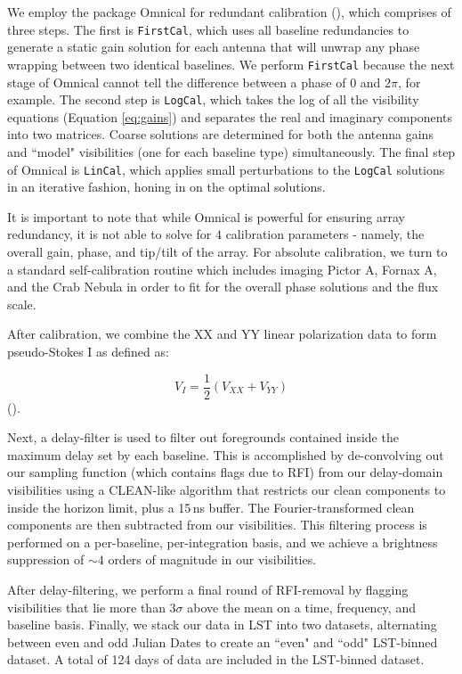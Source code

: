 We employ the package {\sc Omnical} for redundant calibration (\citealt{zheng_et_al2014}), which comprises of three steps. The first is {\tt FirstCal}, which uses all baseline redundancies to generate a static gain solution for each antenna that will unwrap any phase wrapping between two identical baselines. We perform {\tt FirstCal} because the next stage of {\sc Omnical} cannot tell the difference between a phase of $0$ and $2\pi$, for example. The second step is {\tt LogCal}, which takes the log of all the visibility equations (Equation \eqref{eq:gains}) and separates the real and imaginary components into two matrices. Coarse solutions are determined for both the antenna gains and ``model" visibilities (one for each baseline type) simultaneously. The final step of {\sc Omnical} is {\tt LinCal}, which applies small perturbations to the {\tt LogCal} solutions in an iterative fashion, honing in on the optimal solutions.
 
It is important to note that while {\sc Omnical} is powerful for ensuring array redundancy, it is not able to solve for $4$ calibration parameters - namely, the overall gain, phase, and tip/tilt of the array. For absolute calibration, we turn to a standard self-calibration routine which includes imaging Pictor A, Fornax A, and the Crab Nebula in order to fit for the overall phase solutions and the flux scale.

After calibration, we combine the XX and YY linear polarization data to form pseudo-Stokes I as defined as:

\begin{equation}
\label{eq:stokes}
V_{I} = \frac{1}{2}(V_{XX}+V_{YY})
\end{equation}
(\citealt{moore_et_al2013}).

Next, a delay-filter is used to filter out foregrounds contained inside the maximum delay set by each baseline. This is accomplished by de-convolving out our sampling function (which contains flags due to RFI) from our delay-domain visibilities using a CLEAN-like algorithm that restricts our clean components to inside the horizon limit, plus a 15\,ns buffer. The Fourier-transformed clean components are then subtracted from our visibilities. This filtering process is performed on a per-baseline, per-integration basis, and we achieve a brightness suppression of $\sim4$ orders of magnitude in our visibilities.

After delay-filtering, we perform a final round of RFI-removal by flagging visibilities that lie more than $3\sigma$ above the mean on a time, frequency, and baseline basis. Finally, we stack our data in LST into two datasets, alternating between even and odd Julian Dates to create an ``even" and ``odd" LST-binned dataset. A total of 124 days of data are included in the LST-binned dataset.

